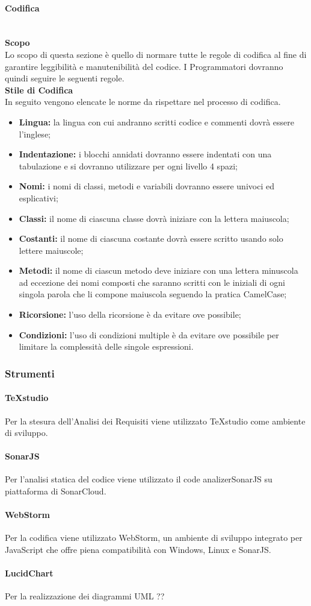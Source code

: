 \paragraph{Codifica} \mbox{}
\\\textbf{Scopo}\\
Lo scopo di questa sezione è quello di normare tutte le regole di codifica al fine di garantire leggibilità e manutenibilità del codice. I Programmatori dovranno quindi seguire le seguenti regole.
\\\textbf{Stile di Codifica}\\
In seguito vengono elencate le norme da rispettare nel processo di codifica.
\begin{itemize}
	\item \textbf{Lingua:} la lingua con cui andranno scritti codice e commenti dovrà essere l'inglese;
	\item \textbf{Indentazione:} i blocchi annidati dovranno essere indentati con una tabulazione e si dovranno utilizzare per ogni livello 4 spazi;
	\item \textbf{Nomi:} i nomi di classi, metodi e variabili dovranno essere univoci ed esplicativi;
	\item \textbf{Classi:} il nome di ciascuna classe dovrà iniziare con la lettera maiuscola; 
	\item \textbf{Costanti:} il nome di ciascuna costante dovrà essere scritto usando solo lettere maiuscole;
	\item \textbf{Metodi:} il nome di ciascun metodo deve iniziare con una lettera minuscola ad eccezione dei nomi composti che saranno scritti con le iniziali di ogni singola parola che li compone maiuscola seguendo la pratica CamelCase;
	\item \textbf{Ricorsione:} l'uso della ricorsione è da evitare ove possibile;
	\item \textbf{Condizioni:} l'uso di condizioni multiple è da evitare ove possibile per limitare la complessità delle singole espressioni\glo.
\end{itemize}
\subsubsection{Strumenti}
\paragraph{TeXstudio}
Per la stesura dell'Analisi dei Requisiti viene utilizzato TeXstudio come ambiente di sviluppo.
\paragraph{SonarJS}
Per l'analisi statica del codice viene utilizzato il code analizer\glosp SonarJS su piattaforma di SonarCloud.
\paragraph{WebStorm}
Per la codifica viene utilizzato WebStorm, un ambiente di sviluppo integrato per JavaScript che offre piena compatibilità con Windows, Linux e SonarJS.
\paragraph{LucidChart}
Per la realizzazione dei diagrammi UML ??	